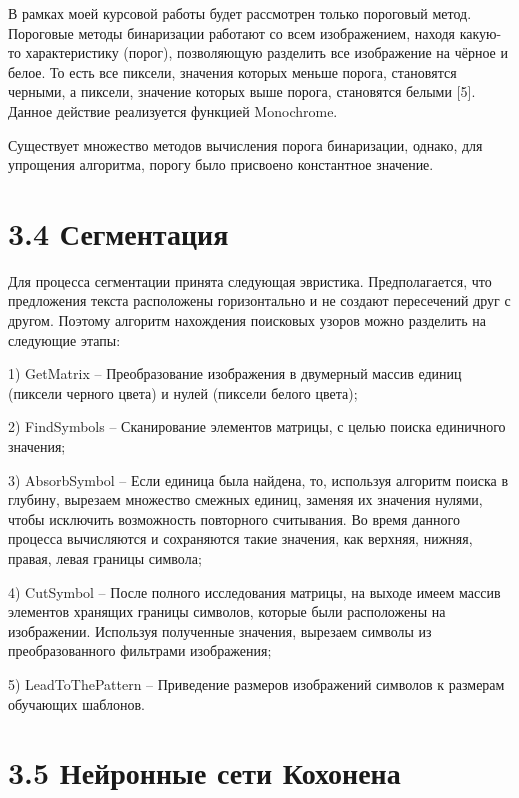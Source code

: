 \documentclass[14pt,a4paper]{extreport}
\begin{document}
  \hspace {4ex}  В рамках моей курсовой работы будет рассмотрен только пороговый метод.
Пороговые методы бинаризации работают со всем изображением, находя какую-то характеристику (порог), позволяющую разделить все изображение на чёрное и белое. То есть все пиксели, значения которых меньше порога, становятся черными, а пиксели, значение которых выше порога, становятся белыми [5]. Данное действие реализуется функцией Monochrome.\

  \hspace {4ex}  Существует множество методов вычисления порога бинаризации, однако, для упрощения алгоритма, порогу было присвоено константное значение.\

                  \section*{\normalsize\hspace{4ex}3.4 Сегментация}
  \hspace {4ex} Для процесса сегментации принята следующая эвристика. Предполагается, что предложения текста расположены горизонтально и не создают пересечений друг с другом. Поэтому алгоритм нахождения поисковых узоров можно разделить на следующие этапы:\
  
  \hspace {4ex} 1) GetMatrix – Преобразование изображения в двумерный массив единиц (пиксели черного цвета) и нулей (пиксели белого цвета);\
  
  \hspace {4ex} 2) FindSymbols  – Сканирование элементов матрицы, с целью поиска единичного значения;\
  
  \hspace {4ex} 3) AbsorbSymbol – Если единица была найдена, то, используя алгоритм поиска в глубину, вырезаем множество смежных единиц, заменяя их значения нулями, чтобы исключить возможность повторного считывания. Во время данного процесса вычисляются и сохраняются такие значения, как верхняя, нижняя, правая, левая границы символа;\
  
  \hspace {4ex} 4) CutSymbol – После полного исследования матрицы, на выходе имеем массив элементов хранящих границы символов, которые были расположены на изображении. Используя полученные значения, вырезаем символы из преобразованного фильтрами изображения;\
  
  \hspace {4ex} 5) LeadToThePattern  – Приведение размеров изображений символов к размерам обучающих шаблонов.\
  
                  \section*{\normalsize\hspace{4ex}3.5 Нейронные сети Кохонена} 
                   
\end{document}
